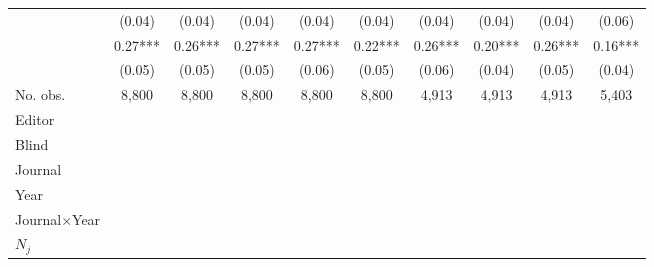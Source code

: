 \begin{table}
\begin{threeparttable}
\begin{tabular}{p{3cm}S@{}S@{}S@{}S@{}S@{}S@{}S@{}S@{}S@{}}
                                          &      (0.04)   &      (0.04)   &      (0.04)   &      (0.04)   &      (0.04)   &      (0.04)   &      (0.04)   &      (0.04)   &      (0.06)   \\
               &        0.27***&        0.26***&        0.27***&        0.27***&        0.22***&        0.26***&        0.20***&        0.26***&        0.16***\\
                                          &      (0.05)   &      (0.05)   &      (0.05)   &      (0.06)   &      (0.05)   &      (0.06)   &      (0.04)   &      (0.05)   &      (0.04)   \\
            \midrule
            No. obs.                      &       8,800   &       8,800   &       8,800   &       8,800   &       8,800   &       4,913   &       4,913   &       4,913   &       5,403   \\
            \midrule
            Editor               &           {}   &           {}   &           {}   &           {}   &           {}   &           {}   &           {}   &           {}   &           {}   \\
            Blind                         &           {}   &           {}   &           {}   &           {}   &           {}   &           {}   &           {}   &           {}   &           {}   \\
            Journal                       &           {}   &           {}   &               &               &               &               &               &               &               \\
            Year                          &               &           {}   &               &               &               &               &               &               &               \\
            Journal\(\times\)Year                  &               &               &           {}   &           {}   &           {}   &           {}   &           {}   &           {}   &           {}   \\
            \(N_j\)                       &               &               &               &           {}   &           {}   &           {}   &           {}   &           {}   &           {}   \\

\end{tabular}
\end{threeparttable}
\end{table}
